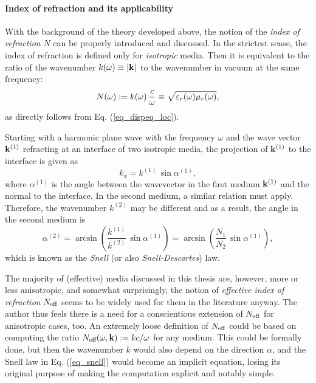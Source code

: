 \paragraph{Index of refraction and its applicability}  %
\label{indexofrefraction}
With the background of the theory developed above, the notion of the \textit{index of refraction} $N$ can be properly introduced and discussed. 
In the strictest sense, the index of refraction is defined only for \textit{isotropic} media. Then it is equivalent to the ratio of the wavenumber $k(\omega) \equiv |{\mathbf{k}}|$ to the wavenumber in vacuum at the same frequency: 
\begin{equation} N(\omega) := k(\omega) \, \frac{c}{\omega} \equiv \sqrt{\varepsilon_r(\omega)\mu_r(\omega)}, \label{eq_dispeqN}\end{equation}
as directly follows from Eq. (\ref{eq_dispeq_loc}).

Starting with a harmonic plane wave with the frequency $\omega$ and the wave vector ${\mathbf{k}}^{(1)}$ refracting at an interface of two isotropic media, the projection of ${\mathbf{k}}^{(1)}$ to the interface is given as 
$$ k_x = k^{(1)}\,\sin \alpha^{(1)}, $$
where $\alpha^{(1)}$ is the angle between the wavevector in the first medium ${\mathbf{k}}^{(1)}$ and the  normal to the interface. In the second medium, a similar relation must apply. Therefore, the wavenumber $k^{(2)}$ may be different and as a result, the angle in the second medium is
\begin{equation} \alpha^{(2)} = \arcsin\left( \frac{k^{(1)}}{k^{(2)}} \,\sin \alpha^{(1)} \right) = \arcsin\left( \frac{N_1}{N_2} \,\sin \alpha^{(1)} \right), \label{eq_snell}\end{equation}
which is known as the \textit{Snell} (or also \textit{Snell-Descartes}) law.

The majority of (effective) media discussed in this thesis are, however, more or less anisotropic, and somewhat surprisingly, the notion of \textit{effective index of refraction} $N_{\text{eff} }$ seems to be widely used for them in the literature anyway. The author thus feels there is a need for a conscientious extension of $N_{\text{eff} }$ for anisotropic cases, too. An extremely loose definition of $N_{\text{eff} }$ could be based on computing the ratio $N_{\text{eff} }(\omega, {\mathbf{k}}) := kc/\omega$  for any medium. This could be formally done, but then the wavenumber $k$ would also depend on the direction $\alpha$, and the Snell law in Eq. (\ref{eq_snell}) would become an implicit equation, losing its original purpose of making the computation explicit and notably simple.

